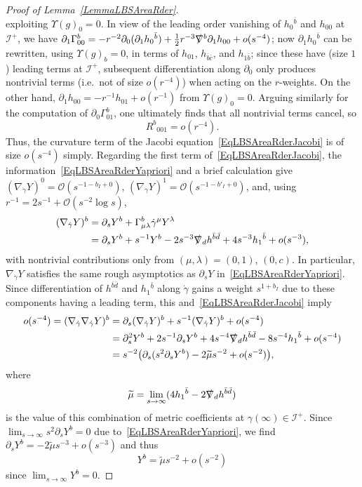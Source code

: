 \documentclass[reqno,11pt,letterpaper]{amsart}
\numberwithin{equation}{section}
\numberwithin{figure}{section}
\theoremstyle{definition}
\theoremstyle{remark}
\newcommand{\mc}{\mathcal}
\newcommand{\cO}{\mc O}
\newcommand{\ms}{\mathscr}
\newcommand{\scri}{\ms I}
\newcommand{\slnabla}{\slashed{\nabla}{}}
\newcommand{\Ups}{\Upsilon}
\newcommand{\pa}{\partial}
\newcommand{\wt}{\widetilde}
\newcommand{\half}{\tfrac{1}{2}}
\newcommand{\usref}[1]{{\upshape\ref{#1}}}
\begin{document}
\begin{proof}[Proof of Lemma~\usref{LemmaLBSAreaRder}]
\[  \]
  exploiting $\Ups(g)_0=0$. In view of the leading order vanishing of $h_0{}^{\bar b}$ and $h_{0 0}$ at $\scri^+$, we have $\pa_1\Gamma^b_{0 0}=-r^{-2}\pa_0(\pa_1 h_0{}^{\bar b})+\half r^{-3}\slnabla^b\pa_1 h_{0 0}+o(s^{-4})$; now $\pa_1 h_0{}^{\bar b}$ can be rewritten, using $\Ups(g)_b=0$, in terms of $h_{0 1}$, $h_{\bar b\bar c}$, and $h_{1\bar b}$; since these have (size $1$) leading terms at $\scri^+$, subsequent differentiation along $\pa_0$ only produces nontrivial terms (i.e.\ not of size $o(r^{-4})$) when acting on the $r$-weights. On the other hand, $\pa_1 h_{0 0}=-r^{-1}h_{0 1}+o(r^{-1})$ from $\Ups(g)_0=0$. Arguing similarly for the computation of $\pa_0\Gamma^b_{0 1}$, one ultimately finds that all nontrivial terms cancel, so
  \[
    R^b{}_{0 0 1} = o(r^{-4}).
  \]
  Thus, the curvature term of the Jacobi equation~\eqref{EqLBSAreaRderJacobi} is of size $o(s^{-4})$ simply. Regarding the first term of~\eqref{EqLBSAreaRderJacobi}, the information~\eqref{EqLBSAreaRderYapriori} and a brief calculation give $(\nabla_{\dot\gamma}Y)^0=\cO(s^{-1-b_I+0})$, $(\nabla_{\dot\gamma}Y)^1 = \cO(s^{-1-b'_I+0})$, and, using $r^{-1}=2 s^{-1}+\cO(s^{-2}\log s)$,
  \begin{align*}
    (\nabla_{\dot\gamma}Y)^b &= \pa_s Y^b + \Gamma^b_{\mu\lambda}\dot\gamma^\mu Y^\lambda \\
      &= \pa_s Y^b + s^{-1}Y^b - 2 s^{-3}\slnabla_d h^{\bar b\bar d} + 4 s^{-3}h_1{}^{\bar b} + o(s^{-3}),
  \end{align*}
  with nontrivial contributions only from $(\mu,\lambda)=(0,1)$, $(0,c)$. In particular, $\nabla_{\dot\gamma}Y$ satisfies the same rough asymptotics as $\pa_s Y$ in~\eqref{EqLBSAreaRderYapriori}. Since differentiation of $h^{\bar b\bar d}$ and $h_1{}^{\bar b}$ along $\dot\gamma$ gains a weight $s^{1+b_I}$ due to these components having a leading term, this and~\eqref{EqLBSAreaRderJacobi} imply
  \begin{align*}
    o(s^{-4}) = (\nabla_{\dot\gamma}\nabla_{\dot\gamma}Y)^b &= \pa_s(\nabla_{\dot\gamma}Y)^b + s^{-1}(\nabla_{\dot\gamma}Y)^b + o(s^{-4}) \\
      &= \pa_s^2 Y^b + 2 s^{-1}\pa_s Y^b + 4 s^{-4}\slnabla_d h^{\bar b\bar d}-8 s^{-4}h_1{}^{\bar b} + o(s^{-4}) \\
      &= s^{-2}\bigl(\pa_s(s^2 \pa_s Y^b) - 2\wt\mu s^{-2} + o(s^{-2})\bigr),
  \end{align*}
  where
  \[
    \wt\mu=\lim_{s\to\infty}(4 h_1{}^{\bar b}-2\slnabla_d h^{\bar b\bar d})
  \]
  is the value of this combination of metric coefficients at $\gamma(\infty)\in\scri^+$. Since $\lim_{s\to\infty}s^2\pa_s Y^b=0$ due to~\eqref{EqLBSAreaRderYapriori}, we find $\pa_s Y^b=-2\wt\mu s^{-3}+o(s^{-3})$ and thus
  \begin{equation}
  \label{EqLBSAreaRderDeviation}
    Y^b=\wt\mu s^{-2}+o(s^{-2})
  \end{equation}
  since $\lim_{s\to\infty} Y^b=0$.


\end{proof}
\end{document}
